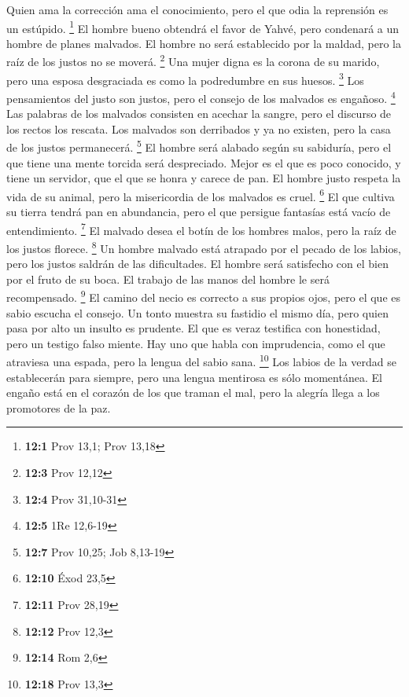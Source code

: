 \begin{paracol}{2}
 Quien ama la corrección ama el conocimiento, pero el que
odia la reprensión es un estúpido. \footnote{\textbf{12:1} Prov 13,1;
  Prov 13,18}  El hombre bueno obtendrá el favor de Yahvé,
pero condenará a un hombre de planes malvados.  El hombre
no será establecido por la maldad, pero la raíz de los justos no se
moverá. \footnote{\textbf{12:3} Prov 12,12}  Una mujer
digna es la corona de su marido, pero una esposa desgraciada es como la
podredumbre en sus huesos. \footnote{\textbf{12:4} Prov 31,10-31}
 Los pensamientos del justo son justos, pero el consejo de
los malvados es engañoso. \footnote{\textbf{12:5} 1Re 12,6-19}
 Las palabras de los malvados consisten en acechar la
sangre, pero el discurso de los rectos los rescata.  Los
malvados son derribados y ya no existen, pero la casa de los justos
permanecerá. \footnote{\textbf{12:7} Prov 10,25; Job 8,13-19}
 El hombre será alabado según su sabiduría, pero el que
tiene una mente torcida será despreciado.  Mejor es el que
es poco conocido, y tiene un servidor, que el que se honra y carece de
pan.  El hombre justo respeta la vida de su animal, pero
la misericordia de los malvados es cruel. \footnote{\textbf{12:10} Éxod
  23,5}  El que cultiva su tierra tendrá pan en
abundancia, pero el que persigue fantasías está vacío de entendimiento.
\footnote{\textbf{12:11} Prov 28,19}  El malvado desea el
botín de los hombres malos, pero la raíz de los justos florece.
\footnote{\textbf{12:12} Prov 12,3}  Un hombre malvado
está atrapado por el pecado de los labios, pero los justos saldrán de
las dificultades.  El hombre será satisfecho con el bien
por el fruto de su boca. El trabajo de las manos del hombre le será
recompensado. \footnote{\textbf{12:14} Rom 2,6}  El
camino del necio es correcto a sus propios ojos, pero el que es sabio
escucha el consejo.  Un tonto muestra su fastidio el
mismo día, pero quien pasa por alto un insulto es prudente.
 El que es veraz testifica con honestidad, pero un
testigo falso miente.  Hay uno que habla con imprudencia,
como el que atraviesa una espada, pero la lengua del sabio sana.
\footnote{\textbf{12:18} Prov 13,3}  Los labios de la
verdad se establecerán para siempre, pero una lengua mentirosa es sólo
momentánea.  El engaño está en el corazón de los que
traman el mal, pero la alegría llega a los promotores de la paz.

\end{paracol}
